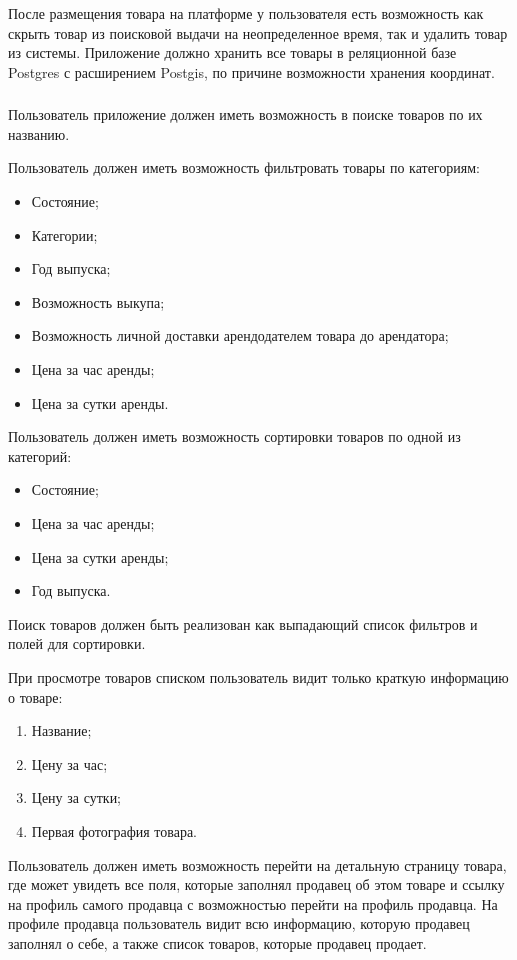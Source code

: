 После размещения товара на платформе у пользователя есть возможность как скрыть товар из поисковой выдачи на неопределенное время, так и удалить товар из системы.
Приложение должно хранить все товары в реляционной базе Postgres с расширением Postgis, по причине возможности хранения координат.

\subsubsection{}

Пользователь приложение должен иметь возможность в поиске товаров по их названию.

Пользователь должен иметь возможность фильтровать товары по категориям:
\begin{itemize}
    \item Состояние;
    \item Категории;
    \item Год выпуска;
    \item Возможность выкупа;
    \item Возможность личной доставки арендодателем товара до арендатора;
    \item Цена за час аренды;
    \item Цена за сутки аренды.
\end{itemize}

Пользователь должен иметь возможность сортировки товаров по одной из категорий:
\begin{itemize}
    \item Состояние;
    \item Цена за час аренды;
    \item Цена за сутки аренды;
    \item Год выпуска.
\end{itemize}

Поиск товаров должен быть реализован как выпадающий список фильтров и полей для сортировки.

При просмотре товаров списком пользователь видит только краткую информацию о товаре:
\begin{enumerate}
    \item Название;
    \item Цену за час;
    \item Цену за сутки;
    \item Первая фотография товара.
\end{enumerate}

Пользователь должен иметь возможность перейти на детальную страницу товара, где может увидеть все поля, которые заполнял продавец об этом товаре и ссылку на профиль самого продавца с возможностью перейти на профиль продавца.
На профиле продавца пользователь видит всю информацию, которую продавец заполнял о себе, а также список товаров, которые продавец продает.

